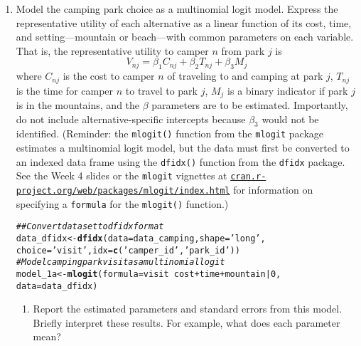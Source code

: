 \documentclass[11pt,letterpaper]{article}\usepackage[]{graphicx}\usepackage[]{color}
\makeatletter
\newcommand{\hlnum}[1]{\textcolor[rgb]{0.686,0.059,0.569}{#1}}%
\newcommand{\hlstr}[1]{\textcolor[rgb]{0.192,0.494,0.8}{#1}}%
\newcommand{\hlcom}[1]{\textcolor[rgb]{0.678,0.584,0.686}{\textit{#1}}}%
\newcommand{\hlopt}[1]{\textcolor[rgb]{0,0,0}{#1}}%
\newcommand{\hlstd}[1]{\textcolor[rgb]{0.345,0.345,0.345}{#1}}%
\newcommand{\hlkwb}[1]{\textcolor[rgb]{0.69,0.353,0.396}{#1}}%
\newcommand{\hlkwc}[1]{\textcolor[rgb]{0.333,0.667,0.333}{#1}}%
\newcommand{\hlkwd}[1]{\textcolor[rgb]{0.737,0.353,0.396}{\textbf{#1}}}%
\newenvironment{kframe}{%
 \def\at@end@of@kframe{}%
 \ifinner\ifhmode%
  \def\at@end@of@kframe{\end{minipage}}%
  \begin{minipage}{\columnwidth}%
 \fi\fi%
 \def\FrameCommand##1{\hskip\@totalleftmargin \hskip-\fboxsep
 \colorbox{shadecolor}{##1}\hskip-\fboxsep
     \hskip-\linewidth \hskip-\@totalleftmargin \hskip\columnwidth}%
 \MakeFramed {\advance\hsize-\width
   \@totalleftmargin\z@ \linewidth\hsize
   \@setminipage}}%
 {\par\unskip\endMakeFramed%
 \at@end@of@kframe}
\newenvironment{knitrout}{}{} %
\makeatother
\begin{document}
\begin{enumerate}[label=\alph*., leftmargin=*]
	\item Model the camping park choice as a multinomial logit model. Express the representative utility of each alternative as a linear function of its cost, time, and setting---mountain or beach---with common parameters on each variable. That is, the representative utility to camper $n$ from park $j$ is
	$$V_{nj} = \beta_1 C_{nj} + \beta_2 T_{nj} + \beta_3 M_j$$
	where $C_{nj}$ is the cost to camper $n$ of traveling to and camping at park $j$, $T_{nj}$ is the time for camper $n$ to travel to park $j$, $M_j$ is a binary indicator if park $j$ is in the mountains, and the $\beta$ parameters are to be estimated. Importantly, do not include alternative-specific intercepts because $\beta_3$ would not be identified. (Reminder: the \texttt{mlogit()} function from the \texttt{mlogit} package estimates a multinomial logit model, but the data must first be converted to an indexed data frame using the \texttt{dfidx()} function from the \texttt{dfidx} package. See the Week 4 slides or the \texttt{mlogit} vignettes at \href{https://cran.r-project.org/web/packages/mlogit/index.html}{\texttt{cran.r-project.org/web/packages/mlogit/index.html}} for information on specifying a \texttt{formula} for the \texttt{mlogit()} function.)

\begin{knitrout}
\color{fgcolor}\begin{kframe}
\begin{alltt}
\hlcom{## Convert dataset to dfidx format}
\hlstd{data_dfidx} \hlkwb{<-} \hlkwd{dfidx}\hlstd{(}\hlkwc{data} \hlstd{= data_camping,} \hlkwc{shape} \hlstd{=} \hlstr{'long'}\hlstd{,}
                    \hlkwc{choice} \hlstd{=} \hlstr{'visit'}\hlstd{,} \hlkwc{idx} \hlstd{=} \hlkwd{c}\hlstd{(}\hlstr{'camper_id'}\hlstd{,} \hlstr{'park_id'}\hlstd{))}
\hlcom{# Model camping park visit as a multinomial logit}
\hlstd{model_1a} \hlkwb{<-} \hlkwd{mlogit}\hlstd{(}\hlkwc{formula} \hlstd{= visit} \hlopt{~} \hlstd{cost} \hlopt{+} \hlstd{time} \hlopt{+} \hlstd{mountain} \hlopt{|} \hlnum{0}\hlstd{,}
                   \hlkwc{data} \hlstd{= data_dfidx)}
\end{alltt}
\end{kframe}
\end{knitrout}

	\begin{enumerate}[label=\roman*.]
		\item Report the estimated parameters and standard errors from this model. Briefly interpret these results. For example, what does each parameter mean?


\end{enumerate}
\end{enumerate}
\end{document}
